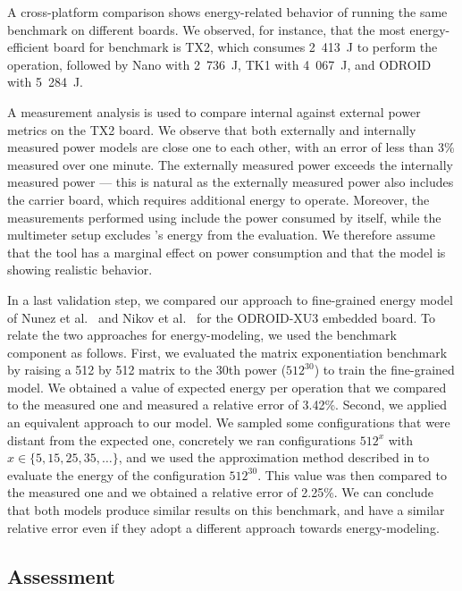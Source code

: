 A cross-platform comparison shows energy-related behavior of running the same benchmark on different boards. We observed, for instance, that the most energy-efficient board for  benchmark is TX2, which consumes 2~413~J to perform the operation, followed by Nano with 2~736~J, TK1 with 4~067~J, and ODROID with 5~284~J.

A %
measurement analysis is used to compare internal against external power metrics on the TX2 board. We observe that both externally and internally measured power models are close one to each other, with an error of less than 3\% measured over one minute. The externally measured power exceeds the internally measured power --- this is natural as the externally measured power also includes the carrier board, which requires additional energy to operate. Moreover, the measurements performed using \powprof{} include the power consumed by \powprof{} itself, while the multimeter setup excludes \powprof{}'s energy from the evaluation. We therefore assume that the tool has a marginal effect on power consumption and that the model is showing realistic behavior.

In a last validation step, we compared our approach to fine-grained energy model of Nunez et al.~\citep{nunez2013enabling} and Nikov et al.~\citep{nikov2015evaluation} for the ODROID-XU3 embedded board. To relate the two approaches for energy-modeling, we used the  benchmark component as follows. First, we evaluated the matrix exponentiation benchmark by raising a 512 by 512 matrix to the 30th power ($512^{30}$) to train the fine-grained model. We obtained a value of expected energy per operation that we compared to the measured one and measured a relative error of 3.42\%. Second, we applied an equivalent approach to our model. We sampled some configurations that were distant from the expected one, concretely we ran configurations $512^{x}$ with $x\in \{5,15,25,35,\dots\}$, and we used the approximation method described in  to evaluate the energy of the configuration $512^{30}$. This value was then compared to the measured one and we obtained a relative error of 2.25\%. We can conclude that both models produce similar results on this benchmark, and have a similar relative error even if they adopt a different approach towards energy-modeling.

\subsection{\color{cyan}Assessment}
\label{sec:experimental-results:assessment}


